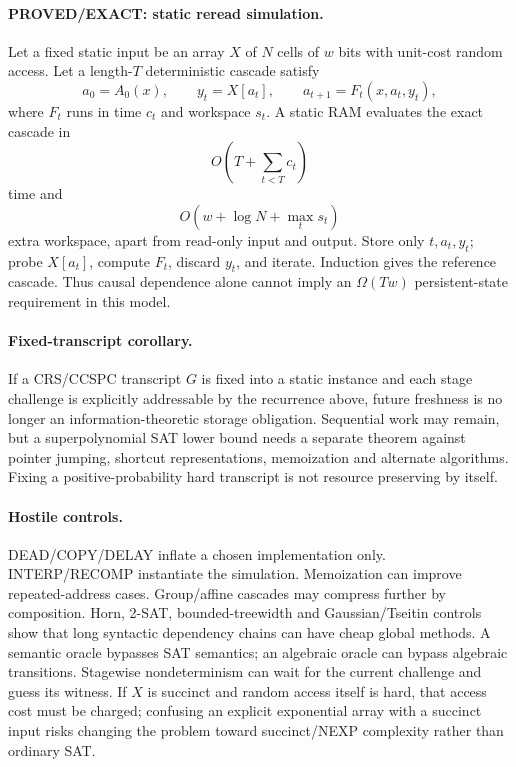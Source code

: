 \documentclass[11pt]{article}
\begin{document}
\paragraph{PROVED/EXACT: static reread simulation.} Let a fixed static input be an array $X$ of $N$ cells of $w$ bits with unit-cost random access. Let a length-$T$ deterministic cascade satisfy
\[
a_0=A_0(x),\qquad y_t=X[a_t],\qquad a_{t+1}=F_t(x,a_t,y_t),
\]
where $F_t$ runs in time $c_t$ and workspace $s_t$. A static RAM evaluates the exact cascade in
\[
\boxed{O(T+\sum_{t<T}c_t)}
\]
time and
\[
\boxed{O(w+\log N+\max_t s_t)}
\]
extra workspace, apart from read-only input and output. Store only $t,a_t,y_t$; probe $X[a_t]$, compute $F_t$, discard $y_t$, and iterate. Induction gives the reference cascade. Thus causal dependence alone cannot imply an $\Omega(Tw)$ persistent-state requirement in this model.

\paragraph{Fixed-transcript corollary.} If a CRS/CCSPC transcript $G$ is fixed into a static instance and each stage challenge is explicitly addressable by the recurrence above, future freshness is no longer an information-theoretic storage obligation. Sequential work may remain, but a superpolynomial SAT lower bound needs a separate theorem against pointer jumping, shortcut representations, memoization and alternate algorithms. Fixing a positive-probability hard transcript is not resource preserving by itself.

\paragraph{Hostile controls.} DEAD/COPY/DELAY inflate a chosen implementation only. INTERP/RECOMP instantiate the simulation. Memoization can improve repeated-address cases. Group/affine cascades may compress further by composition. Horn, 2-SAT, bounded-treewidth and Gaussian/Tseitin controls show that long syntactic dependency chains can have cheap global methods. A semantic oracle bypasses SAT semantics; an algebraic oracle can bypass algebraic transitions. Stagewise nondeterminism can wait for the current challenge and guess its witness. If $X$ is succinct and random access itself is hard, that access cost must be charged; confusing an explicit exponential array with a succinct input risks changing the problem toward succinct/NEXP complexity rather than ordinary SAT.
\end{document}
